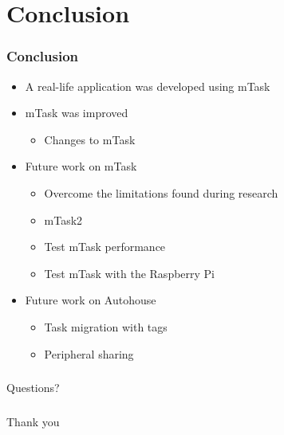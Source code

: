 \documentclass[department=icis, notes={show notes}, slidesperpage=1, official=true,showdate=true,slidenumbers=relative]{beamerruhuisstijl}
\begin{document}
\section{Conclusion}
\begin{frame}[fragile]
  \frametitle{Conclusion}
  \begin{itemize}
      \setlength\itemsep{1em}
      \item A real-life application was developed using mTask
      \item mTask was improved
        \begin{itemize}[label=$\diamond$]
            \item Changes to mTask
        \end{itemize}
      \item Future work on mTask
        \begin{itemize}[label=$\diamond$]
            \item Overcome the limitations found during research
            \item mTask2
            \item Test mTask performance
            \item Test mTask with the Raspberry Pi
        \end{itemize}
      \item Future work on Autohouse
        \begin{itemize}
            \item Task migration with tags
            \item Peripheral sharing
        \end{itemize}
  \end{itemize}
\end{frame}

\begin{frame}[plain,c]
  \frametitle{}
  \begin{center}
    \Huge Questions?
  \end{center}
\end{frame}


\begin{frame}[plain,c]
  \frametitle{}
  \begin{center}
    \Huge Thank you
  \end{center}
\end{frame}
\end{document}
